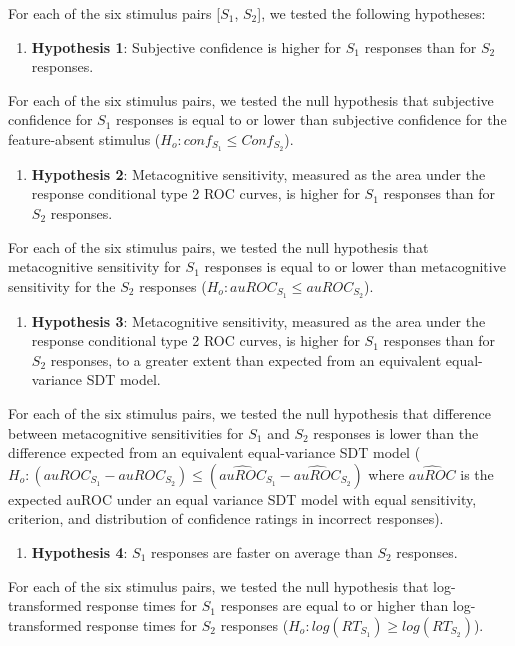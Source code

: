 \documentclass[12pt,twoside]{reedthesis}
\providecommand{\tightlist}{%
  \setlength{\itemsep}{0pt}\setlength{\parskip}{0pt}}
\begin{document}
For each of the six stimulus pairs {[}\(S_1\), \(S_2\){]}, we tested the following hypotheses:
\begin{enumerate}
\def\labelenumi{\arabic{enumi}.}
\tightlist
\item
  \textbf{Hypothesis 1}: Subjective confidence is higher for \(S_1\) responses than for \(S_2\) responses.
\end{enumerate}
For each of the six stimulus pairs, we tested the null hypothesis that subjective confidence for \(S_1\) responses is equal to or lower than subjective confidence for the feature-absent stimulus (\(H_o: conf_{S_1}\leq Conf_{S_2}\)).
\begin{enumerate}
\def\labelenumi{\arabic{enumi}.}
\setcounter{enumi}{1}
\tightlist
\item
  \textbf{Hypothesis 2}: Metacognitive sensitivity, measured as the area under the response conditional type 2 ROC curves, is higher for \(S_1\) responses than for \(S_2\) responses.
\end{enumerate}
For each of the six stimulus pairs, we tested the null hypothesis that metacognitive sensitivity for \(S_1\) responses is equal to or lower than metacognitive sensitivity for the \(S_2\) responses (\(H_o: auROC_{S_1}\leq auROC_{S_2}\)).
\begin{enumerate}
\def\labelenumi{\arabic{enumi}.}
\setcounter{enumi}{2}
\tightlist
\item
  \textbf{Hypothesis 3}: Metacognitive sensitivity, measured as the area under the response conditional type 2 ROC curves, is higher for \(S_1\) responses than for \(S_2\) responses, to a greater extent than expected from an equivalent equal-variance SDT model.
\end{enumerate}
For each of the six stimulus pairs, we tested the null hypothesis that difference between metacognitive sensitivities for \(S_1\) and \(S_2\) responses is lower than the difference expected from an equivalent equal-variance SDT model (\(H_o: (auROC_{S_1}-auROC_{S_2})\leq (\widehat{auROC}_{S_1}-\widehat{auROC}_{S_2})\) where \(\widehat{auROC}\) is the expected auROC under an equal variance SDT model with equal sensitivity, criterion, and distribution of confidence ratings in incorrect responses).
\begin{enumerate}
\def\labelenumi{\arabic{enumi}.}
\setcounter{enumi}{3}
\tightlist
\item
  \textbf{Hypothesis 4}: \(S_1\) responses are faster on average than \(S_2\) responses.
\end{enumerate}
For each of the six stimulus pairs, we tested the null hypothesis that log-transformed response times for \(S_1\) responses are equal to or higher than log-transformed response times for \(S_2\) responses (\(H_o: log(RT_{S_1})\geq log(RT_{S_2})\)).
\end{document}
